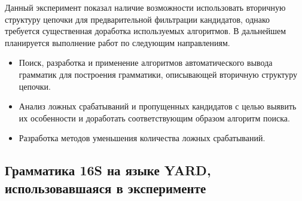 \documentclass[12pt]{article}  %
\theoremstyle{remark}
\begin{document}
Данный эксперимент показал наличие возможности использовать вторичную структуру цепочки для предварительной фильтрации кандидатов, однако требуется существенная доработка используемых алгоритмов.
В дальнейшем планируется выполнение работ по следующим направлениям.
\begin{itemize}
\item Поиск, разработка и применение алгоритмов автоматического вывода грамматик для построения грамматики, описывающей вторичную структуру цепочки.
\item Анализ ложных срабатываний и пропущенных кандидатов с целью выявить их особенности и доработать соответствующим образом алгоритм поиска.
\item Разработка методов уменьшения количества ложных срабатываний.
\end{itemize}

\begin{appendices}
\section{Грамматика 16S на языке YARD, использовавшаяся в эксперименте}
\label{grammar}

\end{appendices}
\end{document}

